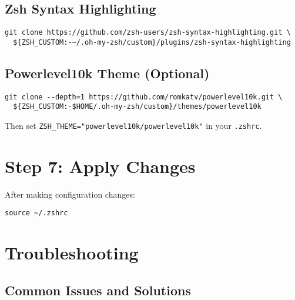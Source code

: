 \documentclass{article}
\begin{document}
\subsection{Zsh Syntax Highlighting}

\begin{verbatim}
git clone https://github.com/zsh-users/zsh-syntax-highlighting.git \
  ${ZSH_CUSTOM:-~/.oh-my-zsh/custom}/plugins/zsh-syntax-highlighting
\end{verbatim}

\subsection{Powerlevel10k Theme (Optional)}

\begin{verbatim}
git clone --depth=1 https://github.com/romkatv/powerlevel10k.git \
  ${ZSH_CUSTOM:-$HOME/.oh-my-zsh/custom}/themes/powerlevel10k
\end{verbatim}

Then set \verb|ZSH_THEME="powerlevel10k/powerlevel10k"| in your \verb|.zshrc|.

\section{Step 7: Apply Changes}

After making configuration changes:

\begin{verbatim}
source ~/.zshrc
\end{verbatim}

\section{Troubleshooting}

\subsection{Common Issues and Solutions}
\end{document}
